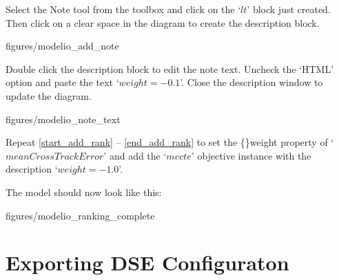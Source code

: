 \documentclass[11pt,a4paper]{../tutorial}
\begin{document}
\begin{instructions}
\newpage

\item Select the Note tool from the toolbox and click on the `$lt$' block just created. Then click on a clear space in the diagram to create the description block.

\begin{center}
\begin{annotation}[width=0.7\linewidth]{figures/modelio_add_note}
    \end{annotation}
\end{center}

\newpage

\item \label{end_add_rank} Double click the description block to edit the note text. Uncheck the `HTML' option and paste the text \mbox{`$weight = -0.1$'}. Close the description window to update the diagram.

\begin{center}
\begin{annotation}[width=0.7\linewidth]{figures/modelio_note_text}
    \end{annotation}
\end{center}

\item Repeat \ref{start_add_rank} -- \ref{end_add_rank} to set the \{\}weight property of `$meanCrossTrackError$' and add the `$mecte$' objective instance with the description \mbox{`$weight = -1.0$'}.

The model should now look like this:

\begin{center}
\begin{annotation}[width=0.7\linewidth]{figures/modelio_ranking_complete}
    \end{annotation}
\end{center}


\end{instructions}

\newpage

\section{Exporting DSE Configuraton}
\end{document}
